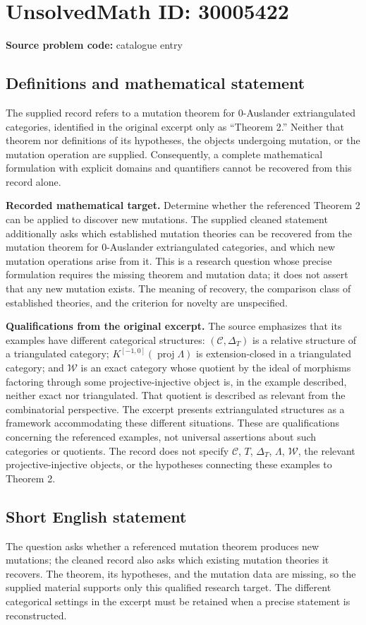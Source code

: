 \documentclass[11pt]{article}
\begin{document}
\section*{UnsolvedMath ID: 30005422}
\textbf{Source problem code:} catalogue entry
\subsection{Definitions and mathematical statement}
The supplied record refers to a mutation theorem for \(0\)-Auslander extriangulated categories, identified in the original excerpt only as ``Theorem 2.'' Neither that theorem nor definitions of its hypotheses, the objects undergoing mutation, or the mutation operation are supplied. Consequently, a complete mathematical formulation with explicit domains and quantifiers cannot be recovered from this record alone.

\textbf{Recorded mathematical target.} Determine whether the referenced Theorem 2 can be applied to discover new mutations. The supplied cleaned statement additionally asks which established mutation theories can be recovered from the mutation theorem for \(0\)-Auslander extriangulated categories, and which new mutation operations arise from it. This is a research question whose precise formulation requires the missing theorem and mutation data; it does not assert that any new mutation exists. The meaning of recovery, the comparison class of established theories, and the criterion for novelty are unspecified.

\textbf{Qualifications from the original excerpt.} The source emphasizes that its examples have different categorical structures: \((\mathcal C,\Delta_T)\) is a relative structure of a triangulated category; \(K^{[-1,0]}(\operatorname{proj}\Lambda)\) is extension-closed in a triangulated category; and \(\mathcal W\) is an exact category whose quotient by the ideal of morphisms factoring through some projective-injective object is, in the example described, neither exact nor triangulated. That quotient is described as relevant from the combinatorial perspective. The excerpt presents extriangulated structures as a framework accommodating these different situations. These are qualifications concerning the referenced examples, not universal assertions about such categories or quotients. The record does not specify \(\mathcal C\), \(T\), \(\Delta_T\), \(\Lambda\), \(\mathcal W\), the relevant projective-injective objects, or the hypotheses connecting these examples to Theorem 2.
\subsection{Short English statement}
The question asks whether a referenced mutation theorem produces new mutations; the cleaned record also asks which existing mutation theories it recovers. The theorem, its hypotheses, and the mutation data are missing, so the supplied material supports only this qualified research target. The different categorical settings in the excerpt must be retained when a precise statement is reconstructed.
\end{document}
